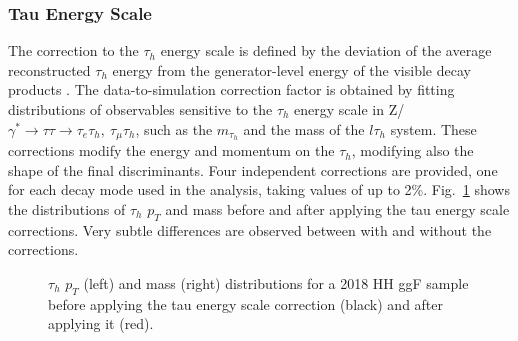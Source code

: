 \documentclass[../main.tex]{subfiles}
\begin{document}
\subsubsection*{Tau Energy Scale}

The correction to the $\tau_h$ energy scale is defined by the deviation of the average reconstructed $\tau_h$ energy from the generator-level energy of the visible \tauh{} decay products \cite{tau_performance_2018, tau_performance_2022}. The data-to-simulation correction factor is obtained by fitting distributions of observables sensitive to the $\tau_h$ energy scale in Z/$\gamma^*\to\tau\tau\to\tau_e\tau_h,~\tau_\mu\tau_h$, such as the $m_{\tau_h}$ and the mass of the $l\tau_h$ system. These corrections modify the energy and momentum on the $\tau_h$, modifying also the shape of the final discriminants. Four independent corrections are provided, one for each decay mode used in the analysis, taking values of up to 2\%. Fig.~\ref{hh:fig:tes} shows the distributions of $\tau_h$ $p_T$ and mass before and after applying the tau energy scale corrections. Very subtle differences are observed between with and without the corrections.

\begin{figure}[h!]
\begin{center}
\end{center}
\caption[Tau energy scale]{$\tau_h$ $p_T$ (left) and mass (right) distributions for a 2018 HH ggF sample before applying the tau energy scale correction (black) and after applying it (red).}
\label{hh:fig:tes}
\end{figure}
\end{document}
